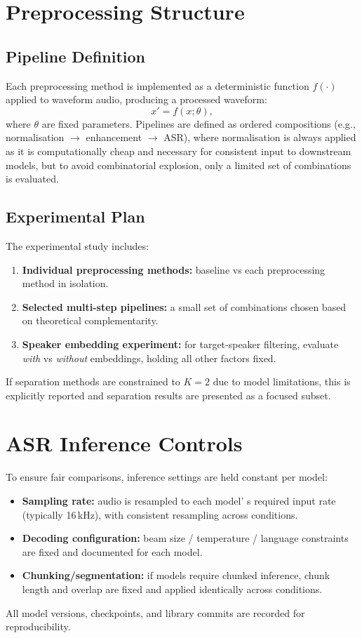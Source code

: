 \section{Preprocessing Structure}
\subsection{Pipeline Definition}
Each preprocessing method is implemented as a deterministic function $f(\cdot)$ applied to waveform audio, producing a processed waveform:
\begin{equation}
x' = f(x;\theta),
\end{equation}
where $\theta$ are fixed parameters. Pipelines are defined as ordered compositions (e.g., normalisation $\rightarrow$ enhancement $\rightarrow$ ASR), where normalisation is always applied as it is computationally cheap and necessary for consistent input to downstream models, but to avoid combinatorial explosion, only a limited set of combinations is evaluated.

\subsection{Experimental Plan}
The experimental study includes:
\begin{enumerate}[leftmargin=*]
    \item \textbf{Individual preprocessing methods:} baseline vs each preprocessing method in isolation.
    \item \textbf{Selected multi-step pipelines:} a small set of combinations chosen based on theoretical complementarity.
    \item \textbf{Speaker embedding experiment:} for target-speaker filtering, evaluate \textit{with} vs \textit{without} embeddings, holding all other factors fixed.
\end{enumerate}
If separation methods are constrained to $K=2$ due to model limitations, this is explicitly reported and separation results are presented as a focused subset.

\section{ASR Inference Controls}
To ensure fair comparisons, inference settings are held constant per model:
\begin{itemize}
    \item \textbf{Sampling rate:} audio is resampled to each model' s required input rate (typically 16\,kHz), with consistent resampling across conditions.
    \item \textbf{Decoding configuration:} beam size / temperature / language constraints are fixed and documented for each model.
    \item \textbf{Chunking/segmentation:} if models require chunked inference, chunk length and overlap are fixed and applied identically across conditions.
\end{itemize}
All model versions, checkpoints, and library commits are recorded for reproducibility.

